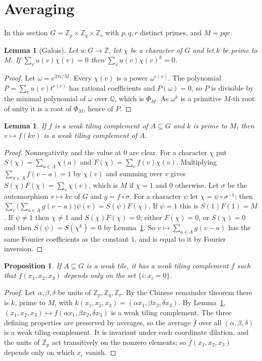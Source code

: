 \documentclass[11pt,a4paper]{amsart}
\newtheorem{proposition}[theorem]{Proposition}
\newtheorem{lemma}[theorem]{Lemma}
\theoremstyle{definition}
\theoremstyle{remark}
\newcommand{\Z}{\mathbb{Z}}
\newcommand{\Q}{\mathbb{Q}}
\begin{document}
\section{Averaging}\label{sec:avg}

In this section $G=\Z_p\times\Z_q\times\Z_r$ with $p,q,r$ distinct primes, and $M=pqr$.

\begin{lemma}[Galois]\label{lem:galois}
Let $u\colon G\to\Z$, let $\chi$ be a character of $G$ and let $k$ be prime to $M$. If $\sum_v u(v)\chi(v)=0$ then
$\sum_v u(v)\chi(v)^k=0$.
\end{lemma}
\begin{proof}
Let $\omega=e^{2\pi i/M}$. Every $\chi(v)$ is a power $\omega^{e(v)}$. The polynomial $P=\sum_v u(v)t^{e(v)}$ has
rational coefficients and $P(\omega)=0$, so $P$ is divisible by the minimal polynomial of $\omega$ over $\Q$,
which is $\Phi_M$. As $\omega^k$ is a primitive $M$-th root of unity it is a root of $\Phi_M$, hence of $P$.
\end{proof}

\begin{lemma}\label{lem:dil}
If $f$ is a weak tiling complement of $A\subseteq G$ and $k$ is prime to $M$, then $v\mapsto f(kv)$ is a weak
tiling complement of $A$.
\end{lemma}
\begin{proof}
Nonnegativity and the value at $0$ are clear. For a character $\chi$ put $S(\chi)=\sum_{a\in A}\chi(a)$ and
$F(\chi)=\sum_v f(v)\chi(v)$. Multiplying $\sum_{a\in A}f(v-a)=1$ by $\chi(v)$ and summing over $v$ gives
$S(\chi)F(\chi)=\sum_v\chi(v)$, which is $M$ if $\chi=1$ and $0$ otherwise. Let $\sigma$ be the automorphism
$v\mapsto kv$ of $G$ and $g=f\circ\sigma$. For a character $\psi$ let $\chi=\psi\circ\sigma^{-1}$; then
$\sum_v\bigl(\sum_{a\in A}g(v-a)\bigr)\psi(v)=S(\psi)F(\chi)$. If $\psi=1$ this is $S(1)F(1)=M$. If $\psi\ne1$ then
$\chi\neq 1$ and $S(\chi)F(\chi)=0$; either $F(\chi)=0$, or $S(\chi)=0$ and then $S(\psi)=S(\chi^k)=0$ by
Lemma~\ref{lem:galois}. So $v\mapsto\sum_{a\in A}g(v-a)$ has the same Fourier coefficients as the constant $1$, and is equal to it by
Fourier inversion.
\end{proof}

\begin{proposition}\label{prop:step}
If $A\subseteq G$ is a weak tile, it has a weak tiling complement $f$ such that $f(x_1,x_2,x_3)$ depends only on
the set $\{i : x_i=0\}$.
\end{proposition}
\begin{proof}
Let $\alpha,\beta,\delta$ be units of $\Z_p,\Z_q,\Z_r$. By the Chinese remainder theorem there is $k$, prime to
$M$, with $k(x_1,x_2,x_3)=(\alpha x_1,\beta x_2,\delta x_3)$. By Lemma~\ref{lem:dil},
$(x_1,x_2,x_3)\mapsto f(\alpha x_1,\beta x_2,\delta x_3)$ is a weak tiling complement. The three defining
properties are preserved by averages, so the average $\bar f$ over all $(\alpha,\beta,\delta)$ is a weak tiling
complement. It is invariant under each coordinate dilation, and the units of $\Z_p$ act transitively on the
nonzero elements; so $\bar f(x_1,x_2,x_3)$ depends only on which $x_i$ vanish.
\end{proof}
\end{document}
